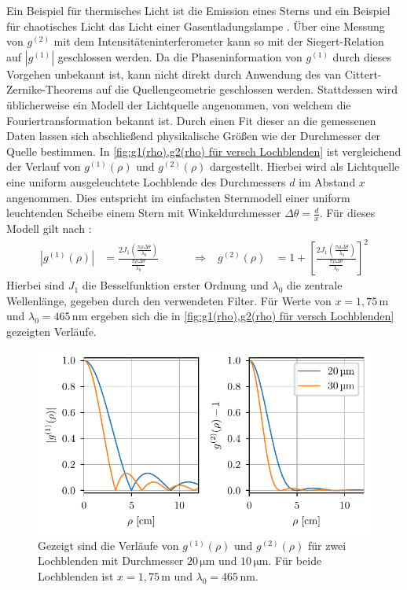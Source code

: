 Ein Beispiel für thermisches Licht ist die Emission eines Sterns und ein Beispiel für chaotisches Licht das Licht einer Gasentladungslampe \cite{foxQuantumOpticsIntroduction2006}. 
Über eine Messung von $g^{(2)}$ mit dem Intensitäteninterferometer kann so mit der Siegert-Relation auf $\left|g^{(1)}\right|$ geschlossen werden. 
Da die Phaseninformation von $g^{(1)}$ durch dieses Vorgehen unbekannt ist, kann nicht direkt durch Anwendung des van Cittert-Zernike-Theorems auf die Quellengeometrie geschlossen werden. 
Stattdessen wird üblicherweise ein Modell der Lichtquelle angenommen, von welchem die Fouriertransformation bekannt ist. 
Durch einen Fit dieser an die gemessenen Daten lassen sich abschließend physikalische Größen wie der Durchmesser der Quelle bestimmen. 
In \autoref{fig:g1(rho),g2(rho) für versch Lochblenden} ist vergleichend der Verlauf von $g^{(1)}(\rho)$ und $g^{(2)}(\rho)$ dargestellt. 
Hierbei wird als Lichtquelle eine uniform ausgeleuchtete Lochblende des Durchmessers $d$ im Abstand $x$ angenommen. 
Dies entspricht im einfachsten Sternmodell einer uniform leuchtenden Scheibe einem Stern mit Winkeldurchmesser $\Delta \theta = \frac{d}{x}$. 
Für dieses Modell gilt nach \cite[Kap. 4.1]{brownIntensityInterferometerIts1974}:
\begin{align}
    \left| g^{(1)}(\rho)\right| &= \frac{2J_1\left(\frac{\pi\rho\Delta\theta}{\lambda_0}\right)}{\frac{\pi\rho\Delta\theta}{\lambda_0}}\quad\quad\quad \Rightarrow & g^{(2)}(\rho) &= 1 + \left[\frac{2J_1\left(\frac{\pi\rho\Delta\theta}{\lambda_0}\right)}{\frac{\pi\rho\Delta\theta}{\lambda_0}}\right]^2
\end{align}
Hierbei sind $J_1$ die Besselfunktion erster Ordnung und $\lambda_0$ die zentrale Wellenlänge, gegeben durch den verwendeten Filter. 
Für Werte von $x=1,75\,\mathrm{m}$ und $\lambda_0=465\,\mathrm{nm}$ ergeben sich die in \autoref{fig:g1(rho),g2(rho) für versch Lochblenden} gezeigten Verläufe. 
\begin{figure}[h]
    \centering
    \includegraphics{images/Theorie/g1_g2_rho.pdf}
    \caption{Gezeigt sind die Verläufe von $g^{(1)}(\rho)$ und $g^{(2)}(\rho)$ für zwei Lochblenden mit Durchmesser $20\,\mathrm{\mu m}$ und $10\,\mathrm{\mu m}$. Für beide Lochblenden ist $x=1,75\,\mathrm{m}$ und $\lambda_0=465\,\mathrm{nm}$.}
    \label{fig:g1(rho),g2(rho) für versch Lochblenden}
\end{figure}
